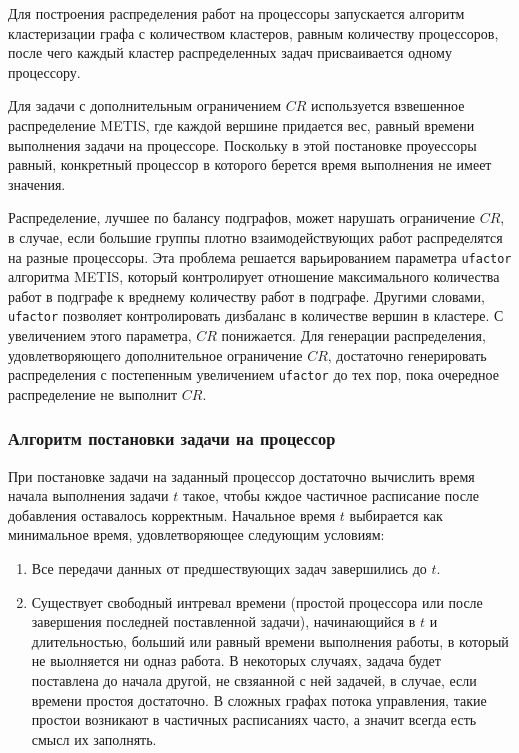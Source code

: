 Для построения распределения работ на процессоры запускается алгоритм кластеризации графа с количеством кластеров, равным количеству процессоров, после чего каждый кластер распределенных задач присваивается одному процессору.

Для задачи с дополнительным ограничением $CR$ используется взвешенное распределение METIS, где каждой вершине придается вес, равный времени выполнения задачи на процессоре. Поскольку в этой постановке проуессоры равный, конкретный процессор в которого берется время выполнения не имеет значения.

Распределение, лучшее по балансу подграфов, может нарушать ограничение $CR$, в случае, если большие группы плотно взаимодействующих работ распределятся на разные процессоры. Эта проблема решается варьированием параметра \texttt{ufactor} алгоритма METIS, который контролирует отношение максимального количества работ в подграфе к вреднему количеству работ в подграфе. Другими словами, \texttt{ufactor} позволяет контролировать дизбаланс в количестве вершин в кластере. С увеличением этого параметра, $CR$ понижается. Для генерации распределения, удовлетворяющего дополнительное ограничение $CR$, достаточно генерировать распределения с постепенным увеличением \texttt{ufactor} до тех пор, пока очередное распределение не выполнит $CR$.

\subsubsection{Алгоритм постановки задачи на процессор} \label{gap_filling}
При постановке задачи на заданный процессор достаточно вычислить время начала выполнения задачи $t$ такое, чтобы кждое частичное расписание после добавления оставалось корректным. Начальное время $t$ выбирается как минимальное время, удовлетворяющее следующим условиям:
\begin{enumerate}
    \item Все передачи данных от предшествующих задач завершились до $t$.
    \item Существует свободный интревал времени (простой процессора или после завершения последней поставленной задачи), начинающийся в $t$ и длительностью, больший или равный времени выполнения работы, в который не выолняется ни одназ работа. В некоторых случаях, задача будет поставлена до начала другой, не свзяанной с ней задачей, в случае, если времени простоя достаточно. В сложных графах потока управления, такие простои возникают в частичных расписаниях часто, а значит всегда есть смысл их заполнять.
\end{enumerate}

